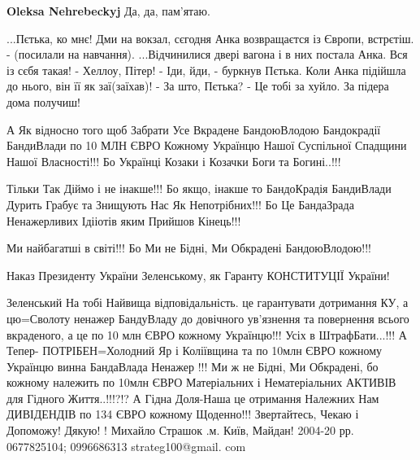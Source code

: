 \begin{itemize}
\begin{itemize}
\textbf{Oleksa Nehrebeckyj} Да, да, пам'ятаю.

\obeycr
...Пєтька, ко мнє! Дми на вокзал, сєгодня Анка возвращаєтся із Європи, встрєтіш. - (посилали на навчання).
...Відчинилися двері вагона і в них постала Анка. Вся із сєбя такая!
- Хеллоу, Пітер!
- Іди, йди, - буркнув Пєтька. Коли Анка підійшла до нього, він її як заї(заїхав)!
- За што, Пєтька?
- Це тобі за хуйло. За підера дома получиш!
\restorecr
\end{itemize}

 

А Як відносно того щоб Забрати Усе Вкрадене БандоюВлодою Бандокрадії БандиВлади
по 10 МЛН ЄВРО Кожному Українцю Нашої Суспільної Спадщини Нашої Власності!!! Бо
Українці Козаки і Козачки Боги та Богині..!!!

Тільки Так Діймо і не інакше!!! Бо якщо, інакше то БандоКрадія БандиВлади
Дурить Грабує та Знищують Нас Як Непотрібних!!! Бо Це БандаЗрада Ненажерливих
Ідііотів яким Прийшов Кінець!!!

Ми найбагатші в світі!!! Бо Ми не Бідні, Ми Обкрадені БандоюВлодою!!!

Наказ Президенту України Зеленському, як Гаранту КОНСТИТУЦІЇ України!

Зеленський На тобі Найвища відповідальність. це гарантувати дотримання КУ, а
цю=Сволоту ненажер БандуВладу до довічного ув'язнення та повернення всього
вкраденого, а це по 10 млн ЄВРО кожному Українцю!!! Усіх в ШтрафБати...!!! А
Тепер- ПОТРІБЕН=Холодний Яр і Коліївщина та по 10млн ЄВРО кожному Українцю
винна БандаВлада Ненажер !!! Ми ж не Бідні, Ми Обкрадені, бо кожному належить
по 10млн ЄВРО Матеріальних і Нематеріальних АКТИВІВ для Гідного Життя..!!!?!? А
Гідна Доля-Наша це отримання Належних Нам ДИВІДЕНДІВ по 134 ЄВРО кожному
Щоденно!!! Звертайтесь, Чекаю і Допоможу! Дякую! ! Михайло Страшок .м. Київ,
Майдан! 2004-20 рр. 0677825104; 0996686313 strateg100@gmail. com

\begin{itemize}
 

\end{itemize}
\end{itemize}
